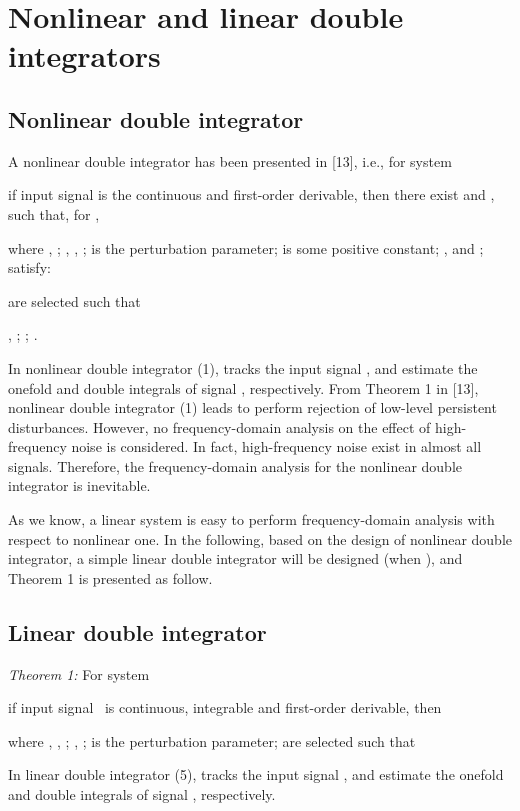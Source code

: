 \documentclass[10pt,journal]{IEEEtran}
\begin{document}
\section{Nonlinear and linear double integrators}

\subsection{Nonlinear double integrator}

A nonlinear double integrator has been presented in [13], i.e., for system

if input signal  is the continuous and first-order
derivable, then there exist  and , such that, for ,

where , ; , , ;  is the perturbation parameter;  is some positive constant; , and ;  satisfy:

 are selected such that

, ; ; .

In nonlinear double integrator (1),  tracks the input signal ,  and  estimate the onefold and double integrals of signal , respectively. From Theorem 1 in [13], nonlinear double integrator (1)
leads to perform rejection of low-level persistent disturbances. However, no
frequency-domain analysis on the effect of high-frequency noise is
considered. In fact, high-frequency noise exist in almost all signals.
Therefore, the frequency-domain analysis for the nonlinear double integrator
is inevitable.

As we know, a linear system is easy to perform frequency-domain analysis
with respect to nonlinear one. In the following, based on the design of
nonlinear double integrator, a simple linear double integrator will be
designed (when ), and Theorem 1 is presented as follow.

\subsection{Linear double integrator}

\emph{Theorem 1:} For system

if input signal \ is continuous, integrable and
first-order derivable, then

where , , ; , ;  is the
perturbation parameter;  are selected such that



In linear double integrator (5),  tracks the input signal ,  and  estimate the onefold and double integrals of signal , respectively.
\end{document}
